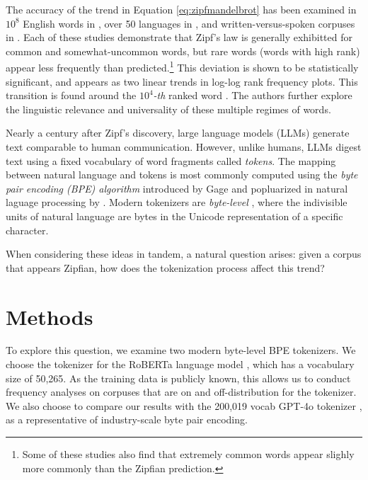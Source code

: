 \documentclass[11pt]{article}
\begin{document}
The accuracy of the trend in Equation \ref{eq:zipfmandelbrot} has been examined in $10^8$ English words in \cite{cancho2000}, over 50 languages in \cite{yu2018zipfslaw50languages}, and written-versus-spoken corpuses in \cite{lin2015scalinglawshumanspeech}. Each of these studies demonstrate that Zipf's law is generally exhibitted for common and somewhat-uncommon words, but rare words (words with high rank) appear less frequently than predicted.\footnote{Some of these studies also find that extremely common words appear slighly more commonly than the Zipfian prediction.} This deviation is shown to be statistically significant, and appears as two linear trends in log-log rank frequency plots. This transition is found around the $10^4$\textit{-th} ranked word \cite{cancho2000} \cite{yu2018zipfslaw50languages}. The authors further explore the linguistic relevance and universality of these multiple regimes of words. 

Nearly a century after Zipf's discovery, large language models (LLMs) generate text comparable to human communication. However, unlike humans, LLMs digest text using a fixed vocabulary of word fragments called \textit{tokens}. The mapping between natural language and tokens is most commonly computed using the \textit{byte pair encoding (BPE) algorithm} introduced by Gage \cite{bpegage} and popluarized in natural laguage processing by \cite{sennrich2016neuralmachinetranslationrare}. Modern tokenizers are \textit{byte-level} \cite{radford2019language}, where the indivisible units of natural language are bytes in the Unicode representation of a specific character.

When considering these ideas in tandem, a natural question arises: given a corpus that appears Zipfian, how does the tokenization process affect this trend?

\section{Methods}

To explore this question, we examine two modern byte-level BPE tokenizers. We choose the tokenizer for the RoBERTa language model \cite{liu2019robertarobustlyoptimizedbert}, which has a vocabulary size of 50,265. As the training data is publicly known, this allows us to conduct frequency analyses on corpuses that are on and off-distribution for the tokenizer.  We also choose to compare our results with the 200,019 vocab GPT-4o tokenizer \cite{openai2024gpt4technicalreport}, as a representative of industry-scale byte pair encoding. 
\end{document}
